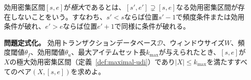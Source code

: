 \begin{definition}[極大効用密集区間]
\label{def:maximal-udi}
効用密集区間$[s, e]$が\emph{極大}であるとは、$[s', e'] \supsetneq [s, e]$なる効用密集区間が存在しないことをいう。すなわち、$s' < s$ならば位置$s'-1$で頻度条件または効用条件が破れ、$e' > e$ならば位置$e'+1$で同様に条件が破れる。
\end{definition}

\textbf{問題定式化。}
効用トランザクションデータベース$\mathcal{D}$、ウィンドウサイズ$W$、頻度閾値$\theta_f$、効用閾値$\theta_u$、最大アイテムセット長$k_{\max}$が与えられたとき、$[s, e]$が$X$の極大効用密集区間（定義~\ref{def:maximal-udi}）であり$|X| \leq k_{\max}$を満たすすべてのペア$(X, [s, e])$を求めよ。
